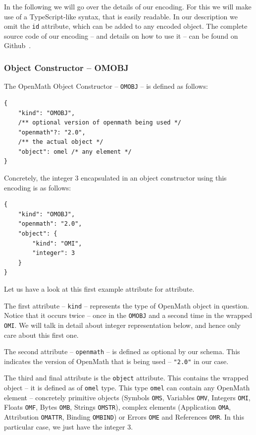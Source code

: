 In the following we will go over the details of our encoding. 
For this we will make use of a TypeScript-like syntax, that is easily readable. 
In our description we omit the \texttt{id} attribute, which can be added to any encoded object. 
The complete source code of our encoding -- and details on how to use it -- can be found on Github~\cite{URL:openmathjson:github}. 

\subsubsection{Object Constructor -- OMOBJ}

The OpenMath Object Constructor -- \texttt{OMOBJ} -- is defined as follows:
\\\begin{minipage}{\linewidth}\begin{lstlisting}
{
    "kind": "OMOBJ",
    /** optional version of openmath being used */
    "openmath"?: "2.0",
    /** the actual object */
    "object": omel /* any element */
}
\end{lstlisting}\end{minipage}
Concretely, the integer 3 encapsulated in an object constructor using this encoding is as follows:
\\\begin{minipage}{\linewidth}\begin{lstlisting}
{
    "kind": "OMOBJ",
    "openmath": "2.0",
    "object": {
        "kind": "OMI", 
        "integer": 3
    }
}
\end{lstlisting}\end{minipage}

Let us have a look at this first example attribute for attribute. 

The first attribute -- \texttt{kind} -- represents the type of OpenMath object in question. 
Notice that it occurs twice -- once in the \texttt{OMOBJ} and a second time in the wrapped \texttt{OMI}. 
We will talk in detail about integer representation below, and hence only care about this first one. 

The second attribute -- \texttt{openmath} -- is defined as optional by our schema. 
This indicates the version of OpenMath that is being used -- \lstinline{"2.0"} in our case. 

The third and final attribute is the \texttt{object} attribute. 
This contains the wrapped object -- it is defined as of \texttt{omel} type. 
This type \texttt{omel} can contain any OpenMath element -- concretely
primitive objects (Symbols \texttt{OMS}, Variables \texttt{OMV}, Integers \texttt{OMI}, Floats \texttt{OMF}, Bytes \texttt{OMB}, Strings \texttt{OMSTR}), 
complex elements (Application \texttt{OMA}, Attribution \texttt{OMATTR}, Binding \texttt{OMBIND}) or
Errors \texttt{OME} and References \texttt{OMR}. 
In this particular case, we just have the integer $3$. 

